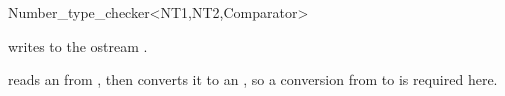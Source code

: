 \begin{ccRefClass} {Number_type_checker<NT1,NT2,Comparator>}

{writes  to the ostream .}

{reads an  from , then converts it to an ,
 so a conversion from  to  is required here.}

\end{ccRefClass} 
